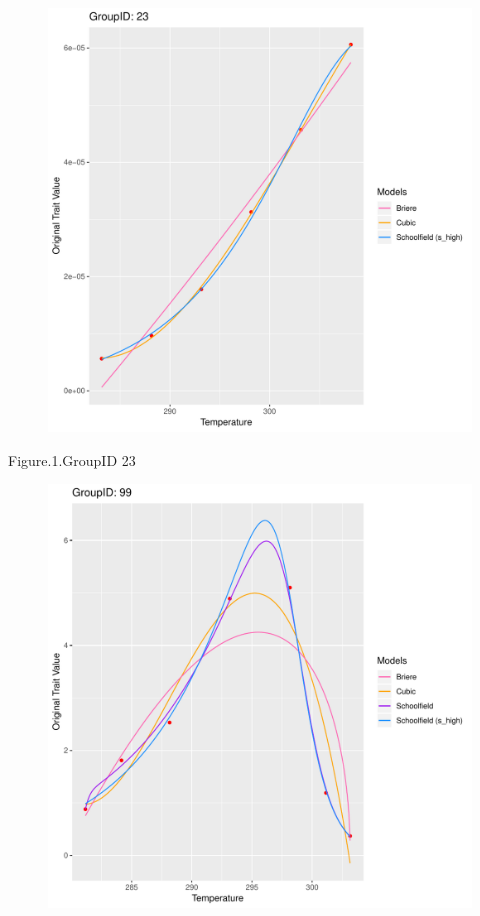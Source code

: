 \documentclass[12pt,a4paper]{article}
\begin{document}
\begin{figure}[H]
\centering
\includegraphics[width=\textwidth]{example1.pdf}
\end{figure}
Figure.1.GroupID 23
\\
\begin{figure}[H]
\centering
\includegraphics[width=\textwidth]{example2.pdf}
\end{figure}
\end{document}
